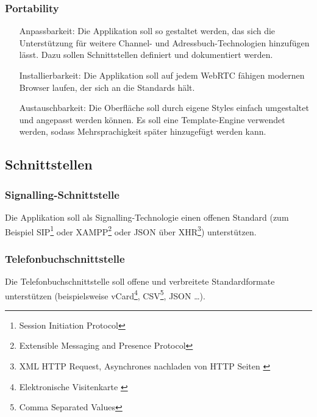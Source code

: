 
		\subsubsection{Portability}
		\begin{itemize}
			\item[Anpassbarkeit:] Die Applikation soll so gestaltet werden, das sich die Unterstützung für weitere Channel- und Adressbuch-Technologien hinzufügen lässt. Dazu sollen Schnittstellen definiert und dokumentiert werden.
			\item[Installierbarkeit:] Die Applikation soll auf jedem WebRTC fähigen modernen Browser laufen, der sich an die Standards hält.
			\item[Austauschbarkeit:] Die Oberfläche soll durch eigene Styles einfach umgestaltet und angepasst werden können. Es soll eine Template-Engine verwendet werden, sodass Mehrsprachigkeit später hinzugefügt werden kann.
		\end{itemize}


	\subsection{Schnittstellen}

		\subsubsection{Signalling-Schnittstelle}
		Die Applikation soll als Signalling-Technologie einen offenen Standard (zum
		Beispiel SIP\footnote{Session Initiation Protocol\cite{IETF-SDP-RFC}} oder 
		XAMPP\footnote{Extensible Messaging and Presence Protocol\cite{IETF-XMPP-RFC}} oder JSON über 
		XHR\footnote{XML HTTP Request, Asynchrones nachladen von HTTP Seiten \cite{MDN-XHR-Cross-Site}}) unterstützen.

		\subsubsection{Telefonbuchschnittstelle}
		Die Telefonbuchschnittstelle soll offene und verbreitete Standardformate
		unterstützen (beispielsweise vCard\footnote{Elektronische Visitenkarte \cite{IETF-vCard-RFC}}, 
		CSV\footnote{Comma Separated Values\cite{IETF-CSV-RFC}}, JSON …).
